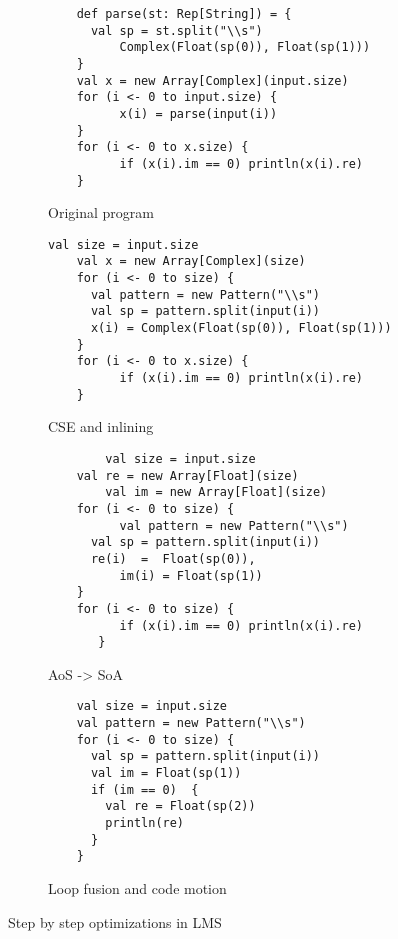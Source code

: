 \begin{figure*}
  \begin{subfigure}[b]{.5\linewidth}
    \begin{lstlisting}
  	def parse(st: Rep[String]) = {               
	  val sp = st.split("\\s")
          Complex(Float(sp(0)), Float(sp(1)))
	}
	val x = new Array[Complex](input.size)
	for (i <- 0 to input.size) {
     	  x(i) = parse(input(i)) 
	}
	for (i <- 0 to x.size) {
    	  if (x(i).im == 0) println(x(i).re) 
	}
    \end{lstlisting}
    \caption{Original program}
  \end{subfigure}
  \begin{subfigure}[b]{.5\linewidth}
    \begin{lstlisting}[label=lst:cse-inline]
        val size = input.size
	val x = new Array[Complex](size)
	for (i <- 0 to size) {
   	  val pattern = new Pattern("\\s") 
	  val sp = pattern.split(input(i))
	  x(i) = Complex(Float(sp(0)), Float(sp(1))) 
	}
	for (i <- 0 to x.size) {
          if (x(i).im == 0) println(x(i).re) 
	}
    \end{lstlisting}
    \caption{CSE and inlining} 
    \label{lst:original}
  \end{subfigure}
  \begin{subfigure}[b]{.5\linewidth}
    \begin{lstlisting}
        val size = input.size
	val re = new Array[Float](size)
        val im = new Array[Float](size)
	for (i <- 0 to size) {
          val pattern = new Pattern("\\s") 
   	  val sp = pattern.split(input(i))
	  re(i)  =  Float(sp(0)),
          im(i) = Float(sp(1)) 
	}
	for (i <- 0 to size) {
          if (x(i).im == 0) println(x(i).re) 
       }
    \end{lstlisting}
    \label{lst:aos-soa}
    \caption{AoS -> SoA}
  \end{subfigure}
\begin{subfigure}[b]{.5\linewidth}
    \begin{lstlisting}
	val size = input.size
	val pattern = new Pattern("\\s") 
	for (i <- 0 to size) {
	  val sp = pattern.split(input(i))
 	  val im = Float(sp(1))
	  if (im == 0)  {
	    val re = Float(sp(2))
 	    println(re)
   	  }
	}
    \end{lstlisting}
    \caption{Loop fusion and code motion}
    \label{lst:fusion-motion}
  \end{subfigure}
  \caption{Step by step optimizations in LMS}
  \label{lst:step-by-step-lms}
\end{figure*}
